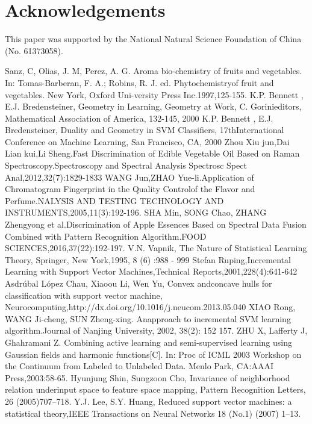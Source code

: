 \documentclass[a4paper]{article}
\begin{document}
\section{Acknowledgements}
This paper was supported by the National Natural Science Foundation of China (No. 61373058).

\renewcommand\refname{References}
\begin{thebibliography}{30}
    Sanz, C, Olias,  J.  M,  Perez,  A.  G. Aroma  bio-chemistry  of  fruits  and  vegetables.  In:  Tomas-Barberan,  F. A.; Robins, R. J. ed. Phytochemistryof  fruit  and  vegetables.  New  York,  Oxford  Uni-versity  Press  Inc.1997,125-155.
    K.P. Bennett , E.J. Bredensteiner, Geometry in Learning, Geometry at Work, C. Gorinieditors, Mathematical Association of America, 132-145, 2000
    K.P. Bennett , E.J. Bredensteiner, Duality and Geometry in SVM Classiﬁers, 17thInternational Conference on Machine Learning, San Francisco, CA, 2000
    Zhou Xiu jun,Dai Lian kui,Li Sheng.Fast Discrimination of Edible Vegetable Oil Based on Raman Spectroscopy.Spectroscopy and Spectral Analysis Spectrosc Spect Anal,2012,32(7):1829-1833
    WANG Jun,ZHAO Yue-li.Application of Chromatogram Fingerprint in the Quality Controlof the Flavor and Perfume.NALYSIS AND TESTING TECHNOLOGY AND INSTRUMENTS,2005,11(3):192-196.
    SHA Min, SONG Chao, ZHANG Zhengyong et al.Discrimination of Apple Essences Based on Spectral Data Fusion Combined with Pattern Recognition Algorithm.FOOD SCIENCES,2016,37(22):192-197.
    V.N. Vapnik, The Nature of Statistical Learning Theory, Springer, New York,1995, 8 (6) :988 - 999
    Stefan Ruping,Incremental Learning with Support Vector Machines,Technical Reports,2001,228(4):641-642
    Asdrúbal López Chau, Xiaoou Li, Wen Yu, Convex andconcave hulls for classification with support vector machine, Neurocomputing,http://dx.doi.org/10.1016/j.neucom.2013.05.040
    XIAO Rong, WANG Ji-cheng, SUN Zheng-xing. Anapproach to incremental SVM learning algorithm.Journal of Nanjing University, 2002, 38(2): 152 157.
    ZHU X, Lafferty J, Ghahramani Z. Combining active learning and semi-supervised learning using Gaussian fields  and  harmonic  functions[C].  In:  Proc  of  ICML  2003  Workshop  on  the  Continuum  from  Labeled  to Unlabeled Data. Menlo Park, CA:AAAI Press,2003:58-65.
    Hyunjung Shin, Sungzoon Cho, Invariance of neighborhood relation underinput space to feature space mapping, Pattern Recognition Letters, 26 (2005)707–718.
    Y.J. Lee, S.Y. Huang, Reduced support vector machines: a statistical theory,IEEE Transactions on Neural Networks 18 (No.1) (2007) 1–13.


\end{thebibliography}
\end{document}
